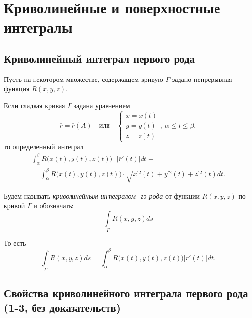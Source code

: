 \section{Криволинейные и поверхностные интегралы}

\setcounter{subsection}{151}

\subsection{Криволинейный интеграл первого рода}

\begin{note}
    Пусть на некотором множестве, содержащем кривую $ \Gamma $ задано непрерывная функция $ R(x,y,z) $.

    Если гладкая кривая $ \Gamma $ задана уравнением
    \[
        \overline{r} = \overline{r}(A) \quad \text{или} \quad \left\{\begin{array}{l}
            x = x(t) \\
            y = y(t) \\
            z = z(t)
        \end{array}\right., \ \alpha \leqslant t \leqslant\beta,
    \]
    то определенный интеграл
    \begin{multline*}
        \int_{\alpha}^{\beta}R\big(x(t),y(t),z(t)\big)\cdot \big|\overline{r}'(t)\big|dt = \\
        = \int_{\alpha}^{\beta}R\bigl(x(t),y(t),z(t)\bigr)\cdot\sqrt{x^{'2}(t) + y^{'2}(t) + z^{'2}(t)}dt.
    \end{multline*}

    Будем называть \emph{криволинейным интегралом -го рода} от функции $ R(x,y,z) $ по кривой $ \Gamma $ и обозначать:
    \[
        \boxed{\int\limits_\Gamma R(x,y,z)ds}
    \]

    То есть
    \[
        \int\limits_\Gamma R(x,y,z)ds = \int_{\alpha}^{\beta}R\big(x(t),y(t),z(t)\big)\big|\overline{r}'(t)\big|dt.
    \]
\end{note}

\subsection{Свойства криволинейного интеграла первого рода (1-3, без доказательств)}

